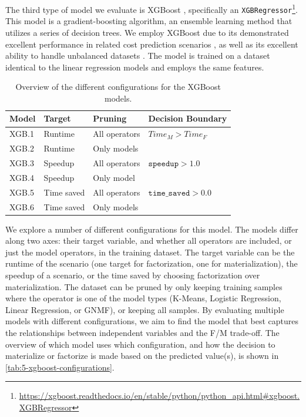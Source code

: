 The third type of model we evaluate is XGBoost \cite{xgboost}, specifically an \texttt{XGBRegressor}\footnote{\url{https://xgboost.readthedocs.io/en/stable/python/python_api.html\#xgboost.XGBRegressor}}. This model is a gradient-boosting algorithm, an ensemble learning method that utilizes a series of decision trees. We employ XGBoost due to its demonstrated excellent performance in related cost prediction scenarios \cite{tvm}, as well as its excellent ability to handle unbalanced datasets \cite{xgboost_imbalanced_data}. The model is trained on a dataset identical to the linear regression models and employs the same features.

\begin{table}[ht]
    \centering
    \begin{tabular}{llll}
        \toprule
        Model & Target     & Pruning       & Decision Boundary            \\
        \midrule \midrule
        XGB.1 & Runtime    & All operators & $Time_M > Time_F$            \\
        XGB.2 & Runtime    & Only models   &                              \\
        XGB.3 & Speedup    & All operators & $\texttt{speedup} > 1.0$     \\
        XGB.4 & Speedup    & Only model    &                              \\
        XGB.5 & Time saved & All operators & $\texttt{time\_saved} > 0.0$ \\
        XGB.6 & Time saved & Only models   &                              \\
        \bottomrule
    \end{tabular}
    \caption[XGBoost configurations]{Overview of the different configurations for the XGBoost models.}
    \label{tab:5-xgboost-configurations}
\end{table}

We explore a number of different configurations for this model. The models differ along two axes: their target variable, and whether all operators are included, or just the model operators, in the training dataset. The target variable can be the runtime of the scenario (one target for factorization, one for materialization), the speedup of a scenario, or the time saved by choosing factorization over materialization. The dataset can be pruned by only keeping training samples where the operator is one of the model types (K-Means, Logistic Regression, Linear Regression, or GNMF), or keeping all samples. By evaluating multiple models with different configurations, we aim to find the model that best captures the relationships between independent variables and the F/M trade-off. The overview of which model uses which configuration, and how the decision to materialize or factorize is made based on the predicted value(s), is shown in \autoref{tab:5-xgboost-configurations}.

